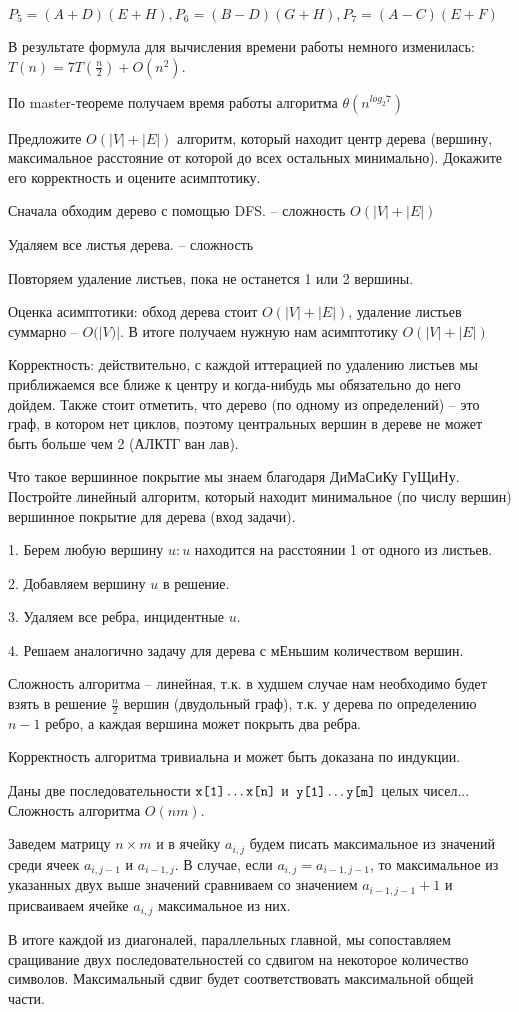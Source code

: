 \documentclass[12pt]{extreport}
\theoremstyle{definiton}
\theoremstyle{definition}
\theoremstyle{definition}
\newcounter{problem}
\newcounter{subproblem}
\def\beforPRskip{
	\bigskip
}
\def\pr{\beforPRskip\noindent\stepcounter{problem}{\bf \theproblem .\;}\setcounter{subproblem}{0}}
\def\prend{
	\bigskip
}
\newcommand{\w}[1]{{\hbox{\texttt{#1}}}}
\begin{document}
$P_5 = (A + D)(E + H), P_6 = (B - D)(G + H), P_7 = (A - C)(E + F)$

В результате формула для вычисления времени работы немного изменилась: $T(n) = 7T(\frac{n}{2}) + O(n^2)$.

По master-теореме получаем время работы алгоритма $\theta(n^{log_2 7})$

\prend   

\pr Предложите $O(|V|+|E|)$ алгоритм, который находит центр дерева (вершину, максимальное расстояние от которой до всех остальных минимально). Докажите его корректность и оцените асимптотику.

	Сначала обходим дерево с помощью DFS. -- сложность $O(|V| + |E|)$

	Удаляем все листья дерева. -- сложность

	Повторяем удаление листьев, пока не останется 1 или 2 вершины.

	Оценка асимптотики: обход дерева стоит $O(|V| + |E|)$, удаление листьев суммарно -- $O(|V)|$. В итоге получаем нужную нам асимптотику $O(|V| + |E|)$

	Корректность: действительно, с каждой иттерацией по удалению листьев мы приближаемся все ближе к центру и когда-нибудь мы обязательно до него дойдем.
	Также стоит отметить, что дерево (по одному из определений) -- это граф, в котором нет циклов, поэтому центральных вершин в дереве не может быть больше чем 2 (АЛКТГ ван лав).

\pr Что такое вершинное покрытие мы знаем благодаря ДиМаСиКу ГуЩиНу. Постройте линейный алгоритм, который находит минимальное (по числу вершин) вершинное покрытие для дерева (вход задачи).

	1. Берем любую вершину $u : u$ находится на расстоянии 1 от одного из листьев.

	2. Добавляем вершину $u$ в решение.

	3. Удаляем все ребра, инцидентные $u$.

	4. Решаем аналогично задачу для дерева с мЕньшим количеством вершин.

	Сложность алгоритма -- линейная, т.к. в худшем случае нам необходимо будет взять в решение $\frac{n}{2}$ вершин (двудольный граф), т.к. у дерева по определению $n - 1$ ребро, а каждая вершина может покрыть два ребра.

	Корректность алгоритма тривиальна и может быть доказана по индукции.

Даны две последовательности $\w{x[1]}\ldots\w{x[n]}$
и~$\w{y[1]}\ldots\w{y[m]}$ целых чисел... Сложность алгоритма $O(nm)$.

	Заведем матрицу $n \times m$ и в ячейку $a_{i, j}$ будем писать максимальное из значений среди ячеек $a_{i, j - 1}$ и $a_{i - 1, j}$.
	В случае, если $a_{i, j} = a_{i - 1, j - 1}$, то максимальное из указанных двух выше значений сравниваем со значением $a_{i - 1, j - 1} + 1$ и присваиваем ячейке $a_{i, j}$ максимальное из них.

	В итоге каждой из диагоналей, параллельных главной, мы сопоставляем сращивание двух последовательностей со сдвигом на некоторое количество символов.
	Максимальный сдвиг будет соответствовать максимальной общей части.

\prend   
\end{document}

